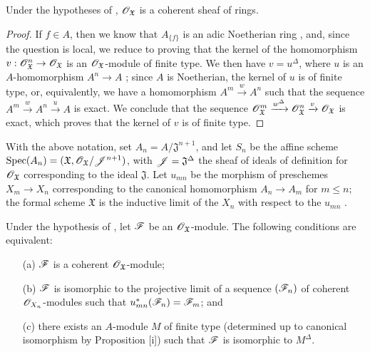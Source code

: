 \begin{proposition}[10.10.3]
\label{I.10.10.3}
Under the hypotheses of , $\mathscr{O}_\mathfrak{X}$ is a coherent sheaf of rings.
\end{proposition}

\begin{proof}
If $f\in A$, then we know that $A_{\{f\}}$ is an adic Noetherian ring , and, since the question is local, we reduce  to proving that the kernel of the homomorphism $v:\sh{O}_\mathfrak{X}^n\to\sh{O}_\mathfrak{X}$ is an $\mathscr{O}_\mathfrak{X}$-module of finite type.
We then have $v=u^\Delta$, where $u$ is an $A$-homomorphism $A^n\to A$ ; since $A$ is Noetherian, the kernel of $u$ is of finite type, or, equivalently, we have a homomorphism $A^m\xrightarrow{w}A^n$ such that the sequence $A^m\xrightarrow{w}A^n\xrightarrow{u}A$ is exact.
We conclude  that the sequence $\mathscr{O}_\mathfrak{X}^m\xrightarrow{w^\Delta}\mathscr{O}_\mathfrak{X}^n\xrightarrow{v}\mathscr{O}_\mathfrak{X}$ is exact, which proves that the kernel of $v$ is of finite type.
\end{proof}

\begin{env}[10.10.4]
\label{I.10.10.4}
With the above notation, set $A_n=A/\mathfrak{J}^{n+1}$, and let $S_n$ be the affine scheme $\operatorname{Spec}(A_n)=(\mathfrak{X},\mathscr{O}_\mathfrak{X}/\mathscr{J}^{n+1})$, with $\mathscr{J}=\mathfrak{J}^\Delta$ the sheaf of ideals of definition for $\mathscr{O}_\mathfrak{X}$ corresponding to the ideal $\mathfrak{J}$.
Let $u_{mn}$ be the morphism of preschemes $X_m\to X_n$ corresponding to the canonical homomorphism $A_n\to A_m$ for $m\leq n$; the formal scheme $\mathfrak{X}$ is the inductive limit of the $X_n$ with respect to the $u_{mn}$ .
\end{env}

\begin{proposition}[10.10.5]
\label{I.10.10.5}
Under the hypothesis of , let $\mathscr{F}$ be an $\mathscr{O}_\mathfrak{X}$-module.
The following conditions are equivalent:
\begin{enumerate}
  \item[\rm{(a)}] $\mathscr{F}$ is a coherent $\mathscr{O}_\mathfrak{X}$-module;
  \item[\rm{(b)}] $\mathscr{F}$ is isomorphic to the projective limit  of a sequence $(\mathscr{F}_n)$ of coherent $\mathscr{O}_{X_n}$-modules such that $u_{mn}^*(\mathscr{F}_n)=\mathscr{F}_m$; and
  \item[\rm{(c)}] there exists an $A$-module $M$ of finite type (determined up to canonical isomorphism by Proposition [i]) such that $\mathscr{F}$ is isomorphic to $M^\Delta$.
\end{enumerate}
\end{proposition}

